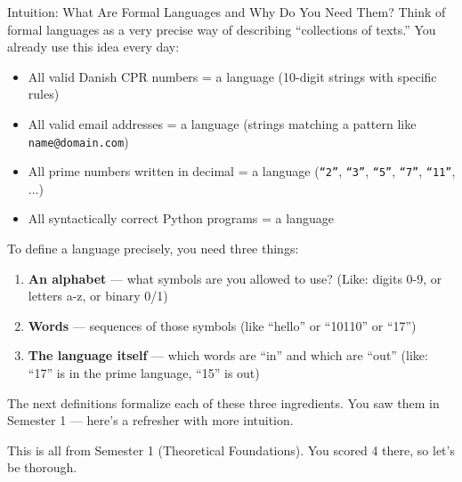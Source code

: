 \documentclass[11pt,a4paper]{article}
\begin{document}
\begin{notebox}{Intuition: What Are Formal Languages and Why Do You Need Them?}
Think of formal languages as a very precise way of describing ``collections of texts.'' You already use this idea every day:
\begin{itemize}[nosep]
\item All valid Danish CPR numbers = a language (10-digit strings with specific rules)
\item All valid email addresses = a language (strings matching a pattern like \texttt{name@domain.com})
\item All prime numbers written in decimal = a language (\texttt{``2''}, \texttt{``3''}, \texttt{``5''}, \texttt{``7''}, \texttt{``11''}, ...)
\item All syntactically correct Python programs = a language
\end{itemize}

To define a language precisely, you need three things:
\begin{enumerate}[nosep]
\item \textbf{An alphabet} --- what symbols are you allowed to use? (Like: digits 0-9, or letters a-z, or binary 0/1)
\item \textbf{Words} --- sequences of those symbols (like ``hello'' or ``10110'' or ``17'')
\item \textbf{The language itself} --- which words are ``in'' and which are ``out'' (like: ``17'' is in the prime language, ``15'' is out)
\end{enumerate}

The next definitions formalize each of these three ingredients. You saw them in Semester 1 --- here's a refresher with more intuition.
\end{notebox}

This is all from Semester 1 (Theoretical Foundations). You scored 4 there, so let's be thorough.
\end{document}
